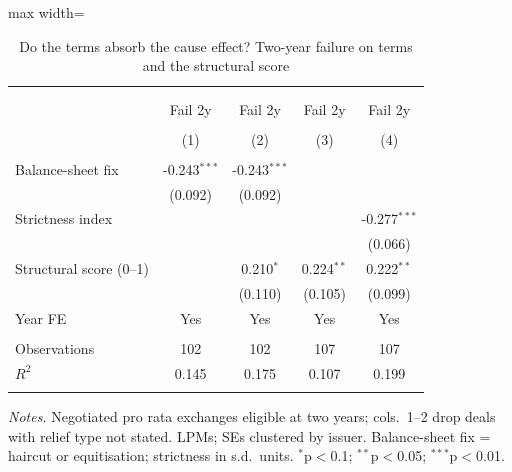 \begin{table}[!htbp] \centering
  \caption{Do the terms absorb the cause effect? Two-year failure on terms and the structural score}
\begin{adjustbox}{max width=\textwidth}
\begin{tabular}{@{\extracolsep{5pt}}lcccc}
\\[-1.8ex]\hline
\hline \\[-1.8ex]
\\[-1.8ex] & \multicolumn{1}{c}{Fail 2y} & \multicolumn{1}{c}{Fail 2y} & \multicolumn{1}{c}{Fail 2y} & \multicolumn{1}{c}{Fail 2y}  \\
\\[-1.8ex] & (1) & (2) & (3) & (4) \\
\hline \\[-1.8ex]
 Balance-sheet fix & -0.243$^{***}$ & -0.243$^{***}$ &  &  \\
& (0.092) & (0.092) &  &  \\
 Strictness index &  &  &  & -0.277$^{***}$ \\
&  &  &  & (0.066) \\
 Structural score (0--1) &  & 0.210$^{*}$ & 0.224$^{**}$ & 0.222$^{**}$ \\
&  & (0.110) & (0.105) & (0.099) \\
 Year FE & Yes & Yes & Yes & Yes \\
\hline \\[-1.8ex]
 Observations & 102 & 102 & 107 & 107 \\
 $R^2$ & 0.145 & 0.175 & 0.107 & 0.199 \\
\hline
\hline \\[-1.8ex]
\end{tabular}
\end{adjustbox}
\label{tab:absorb}
\begin{minipage}{0.95\textwidth}\vspace{4pt}\footnotesize
\textit{Notes.} Negotiated pro rata exchanges eligible at two years; cols.\ 1--2 drop deals with relief type not stated. LPMs; SEs clustered by issuer. Balance-sheet fix = haircut or equitisation; strictness in s.d.\ units. $^{*}$p$<$0.1; $^{**}$p$<$0.05; $^{***}$p$<$0.01.
\end{minipage}
\end{table}
